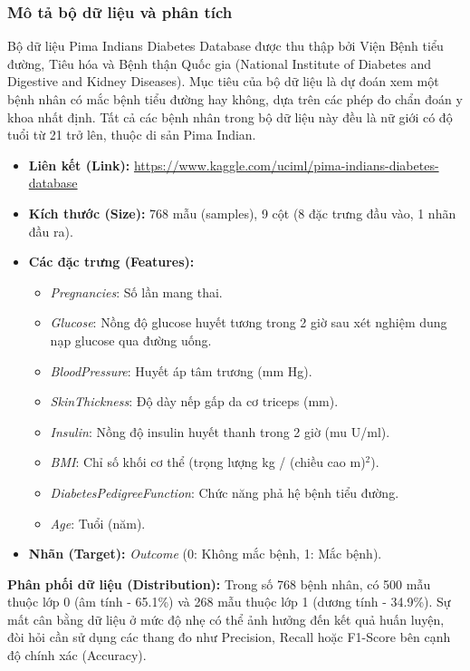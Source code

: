 \subsubsection{Mô tả bộ dữ liệu và phân tích}
Bộ dữ liệu Pima Indians Diabetes Database được thu thập bởi Viện Bệnh tiểu đường, Tiêu hóa và Bệnh thận Quốc gia (National Institute of Diabetes and Digestive and Kidney Diseases). Mục tiêu của bộ dữ liệu là dự đoán xem một bệnh nhân có mắc bệnh tiểu đường hay không, dựa trên các phép đo chẩn đoán y khoa nhất định. Tất cả các bệnh nhân trong bộ dữ liệu này đều là nữ giới có độ tuổi từ 21 trở lên, thuộc di sản Pima Indian.
\begin{itemize}
    \item \textbf{Liên kết (Link):} \url{https://www.kaggle.com/uciml/pima-indians-diabetes-database}
    \item \textbf{Kích thước (Size):} 768 mẫu (samples), 9 cột (8 đặc trưng đầu vào, 1 nhãn đầu ra).
    \item \textbf{Các đặc trưng (Features):}
    \begin{itemize}
        \item \textit{Pregnancies}: Số lần mang thai.
        \item \textit{Glucose}: Nồng độ glucose huyết tương trong 2 giờ sau xét nghiệm dung nạp glucose qua đường uống.
        \item \textit{BloodPressure}: Huyết áp tâm trương (mm Hg).
        \item \textit{SkinThickness}: Độ dày nếp gấp da cơ triceps (mm).
        \item \textit{Insulin}: Nồng độ insulin huyết thanh trong 2 giờ (mu U/ml).
        \item \textit{BMI}: Chỉ số khối cơ thể (trọng lượng kg / (chiều cao m)$^2$).
        \item \textit{DiabetesPedigreeFunction}: Chức năng phả hệ bệnh tiểu đường.
        \item \textit{Age}: Tuổi (năm).
    \end{itemize}
    \item \textbf{Nhãn (Target):} \textit{Outcome} (0: Không mắc bệnh, 1: Mắc bệnh).
\end{itemize}

\textbf{Phân phối dữ liệu (Distribution):}
Trong số 768 bệnh nhân, có 500 mẫu thuộc lớp 0 (âm tính - 65.1\%) và 268 mẫu thuộc lớp 1 (dương tính - 34.9\%). Sự mất cân bằng dữ liệu ở mức độ nhẹ có thể ảnh hưởng đến kết quả huấn luyện, đòi hỏi cần sử dụng các thang đo như Precision, Recall hoặc F1-Score bên cạnh độ chính xác (Accuracy).

